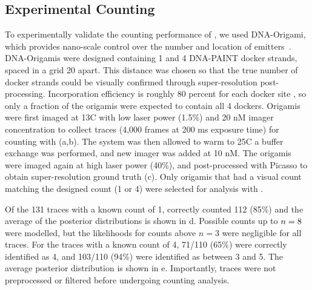 \subsection{Experimental Counting}
To experimentally validate the counting performance of \ours, we used DNA-Origami, 
which provides nano-scale control over the number and location of emitters~\citep{rothemund_folding_2006}.
	DNA-Origamis were designed containing 1 and 4 DNA-PAINT docker strands, 
	spaced in a grid 20 \nanometer apart. 
	This distance was chosen so that the true number of docker strands 
	could be visually confirmed through super-resolution post-processing.
	Incorporation efficiency is roughly 80 percent for each docker site \cite{strauss_2018}, 
	so only a fraction of the origamis were expected to contain all 4 dockers. 
	Origamis were first imaged at 13\textdegree C with low laser power (1.5\%) and 20 nM imager concentration to 
	collect traces (4,000 frames at 200 ms exposure time) for counting with \ours (a,b).
	The system was then allowed to warm to 25\textdegree C a buffer exchange was performed, and new imager 
	was added at 10 nM.
	The origamis were imaged again at high laser power (40\%),
	and post-processed with Picasso \citep{schnitzbauer_2017} to obtain super-resolution ground truth (c).
	Only origamis that had a visual count matching the designed count (1 or 4) were selected for analysis with \ours.

Of the 131 traces with a known count of 1, \ours correctly counted 112 (85\%)
and the average of the posterior distributions is shown in d.
	Possible counts up to $n=8$ were modelled, but the likelihoods for counts above $n=3$ were negligible for all traces.
	For the traces with a known count of 4, 71/110 (65\%) were correctly identified as 4, 
	and 103/110 (94\%) were identified as between 3 and 5. 
	The average posterior distribution is shown in e.
	Importantly, traces were not preprocessed or filtered before undergoing \ours counting analysis.
